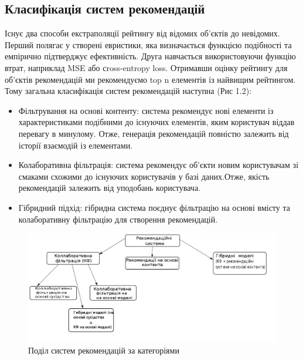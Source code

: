 \subsection{Класифікація систем рекомендацій}
Існує два способи екстраполяції рейтингу від відомих об’єктів до невідомих.
Перший полягає у створені евристики, яка визначається функцією подібності та емпірично підтверджує ефективність. Друга навчається використовуючи функцію втрат, наприклад MSE або сross-entropy loss. Отримавши оцінку рейтингу для об’єктів рекомендацій ми рекомендуємо top n елементів із найвищим рейтингом.
Тому загальна класифікація систем рекомендацій наступна (Рис 1.2):
\begin{itemize}
    \item Фільтрування на основі контенту: система рекомендує нові елементи із характеристиками подібними до існуючих елементів, яким користувач віддав перевагу в минулому. Отже, генерація рекомендацій повністю залежить від історії взаємодій із елементами.
    \item Колаборативна фільтрація: система рекомендує об’єкти новим користувачам зі смаками схожими до існуючих користувачів у базі даних.Отже, якість рекомендацій залежить від уподобань користувача.
    \item Гібридний підхід: гібридна система поєднує фільтрацію на основі вмісту та колаборативну фільтрацію для створення рекомендацій.
\end{itemize}
\begin{figure}
    \centering
    \includegraphics[width=1\textwidth]{images/Rec_system_types.png}
    \caption{Поділ систем рекомендацій за категоріями}
\end{figure}
